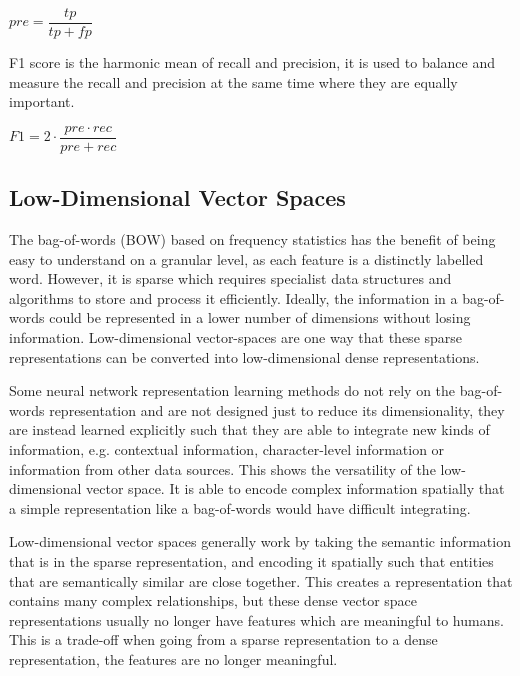${pre} = \dfrac{{tp}} {{tp} + {fp}}$


F1 score is the harmonic mean of recall and precision, it is used to balance and measure the recall and precision at the same time where they are equally important. 

${F1} = 2 \cdot \dfrac{{pre} \cdot {rec}}{{pre} + {rec}}$


\subsection{Low-Dimensional Vector Spaces}\label{ch2:vectorspaces}



The bag-of-words (BOW) based on frequency statistics has the benefit of being easy to understand on a granular level, as each feature is a distinctly labelled word. However, it is sparse which requires specialist data structures and algorithms to store and process it efficiently. Ideally, the  information in a bag-of-words could be represented in a lower number of dimensions without losing information. Low-dimensional vector-spaces are one way that these sparse representations can be converted into low-dimensional dense representations. 

Some neural network representation learning methods do not rely on the bag-of-words representation and are not designed just to reduce its dimensionality, they are instead learned explicitly such that they are able to integrate new kinds of information, e.g. contextual information, character-level information or information from other data sources. This shows the versatility of the low-dimensional vector space. It is able to encode complex information spatially that a simple representation like a bag-of-words would have difficult integrating.

Low-dimensional vector spaces generally work by taking the semantic information that is in the sparse representation, and encoding it spatially such that entities that are semantically similar are close together. This creates a representation that contains many complex relationships, but these dense vector space representations usually no longer have features which are meaningful to humans. This is a trade-off when going from a sparse representation to a dense representation, the features are no longer meaningful. 

